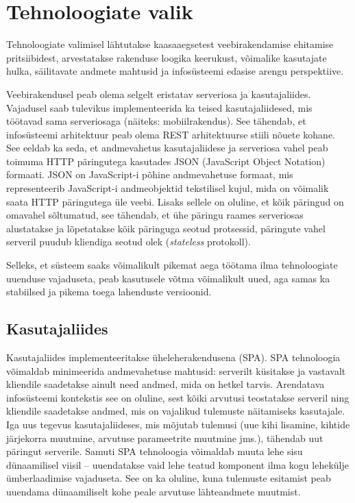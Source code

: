 \section{Tehnoloogiate valik}
Tehnoloogiate valimisel lähtutakse kaasaaegsetest veebirakendamise ehitamise pritsiibidest, arvestatakse
rakenduse loogika keerukust, võimalike kasutajate hulka, säilitavate andmete mahtusid ja infosüsteemi
edasise arengu perspektiive. 

Veebirakendusel peab olema selgelt eristatav serveriosa ja kasutajaliides. Vajadusel saab tulevikus 
implementeerida ka teised kasutajaliidesed, mis töötavad sama serveriosaga (näiteks: mobiilrakendus).
See tähendab, et infosüsteemi arhitektuur peab olema REST arhitektuurse stiili nõuete kohane. See eeldab
ka seda, et andmevahetus kasutajaliidese ja serveriosa vahel peab toimuma HTTP päringutega kasutades 
JSON (JavaScript Object Notation) formaati. JSON on JavaScript-i põhine andmevahetuse formaat, mis 
representeerib JavaScript-i andmeobjektid tekstilisel kujul, mida on võimalik saata HTTP 
päringutega üle veebi\cite{about_rest}.
Lisaks sellele on oluline, et kõik päringud on omavahel sõltumatud, see tähendab, et ühe 
päringu raames serveriosas alustatakse ja lõpetatakse kõik päringuga seotud protsessid, päringute 
vahel serveril puudub kliendiga seotud olek (\textit{stateless} protokoll)\cite{about_rest}.

Selleks, et süsteem saaks võimalikult pikemat aega töötama ilma tehnoloogiate uuenduse vajaduseta,
peab kasutusele võtma võimalikult uued, aga samas ka stabiilsed ja pikema toega lahenduste versioonid. 
 

\subsection{Kasutajaliides}
Kasutajaliides implementeeritakse üheleherakendusena (SPA). SPA tehnoloogia võimaldab minimeerida 
andmevahetuse mahtusid: serverilt küsitakse ja vastavalt kliendile saadetakse ainult need andmed, 
mida on hetkel tarvis. Arendatava infosüsteemi kontekstis see on oluline, sest kõiki arvutusi 
teostatakse serveril ning kliendile saadetakse andmed, mis on vajalikud tulemuste näitamiseks 
kasutajale. Iga uus tegevus kasutajaliideses, mis mõjutab tulemusi (uue kihi lisamine, 
kihtide järjekorra muutmine, arvutuse parameetrite muutmine jms.), tähendab uut päringut serverile. 
Samuti SPA tehnoloogia võimaldab muuta lehe sisu dünaamilisel viisil -- uuendatakse vaid lehe teatud
komponent ilma kogu lehekülje ümberlaadimise vajaduseta. See on ka oluline, kuna tulemuste esitamist 
peab uuendama dünaamiliselt kohe peale arvutuse lähteandmete muutmist.

